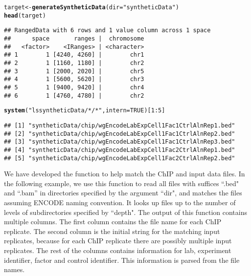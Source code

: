\documentclass[a4paper,10pt]{article}\usepackage[]{graphicx}\usepackage[]{color}
\makeatletter
\newcommand{\hlnum}[1]{\textcolor[rgb]{0.686,0.059,0.569}{#1}}%
\newcommand{\hlstr}[1]{\textcolor[rgb]{0.192,0.494,0.8}{#1}}%
\newcommand{\hlopt}[1]{\textcolor[rgb]{0,0,0}{#1}}%
\newcommand{\hlstd}[1]{\textcolor[rgb]{0.345,0.345,0.345}{#1}}%
\newcommand{\hlkwb}[1]{\textcolor[rgb]{0.69,0.353,0.396}{#1}}%
\newcommand{\hlkwc}[1]{\textcolor[rgb]{0.333,0.667,0.333}{#1}}%
\newcommand{\hlkwd}[1]{\textcolor[rgb]{0.737,0.353,0.396}{\textbf{#1}}}%
\newenvironment{kframe}{%
 \def\at@end@of@kframe{}%
 \ifinner\ifhmode%
  \def\at@end@of@kframe{\end{minipage}}%
  \begin{minipage}{\columnwidth}%
 \fi\fi%
 \def\FrameCommand##1{\hskip\@totalleftmargin \hskip-\fboxsep
 \colorbox{shadecolor}{##1}\hskip-\fboxsep
     \hskip-\linewidth \hskip-\@totalleftmargin \hskip\columnwidth}%
 \MakeFramed {\advance\hsize-\width
   \@totalleftmargin\z@ \linewidth\hsize
   \@setminipage}}%
 {\par\unskip\endMakeFramed%
 \at@end@of@kframe}
\newenvironment{knitrout}{}{} %
\makeatother
\begin{document}
\begin{knitrout}
\color{fgcolor}\begin{kframe}
\begin{alltt}
\hlstd{target} \hlkwb{<-} \hlkwd{generateSyntheticData}\hlstd{(}\hlkwc{dir} \hlstd{=} \hlstr{"syntheticData"}\hlstd{)}
\hlkwd{head}\hlstd{(target)}
\end{alltt}
\begin{verbatim}
## RangedData with 6 rows and 1 value column across 1 space
##      space       ranges |  chromosome
##   <factor>    <IRanges> | <character>
## 1        1 [4240, 4260] |        chr1
## 2        1 [1160, 1180] |        chr2
## 3        1 [2000, 2020] |        chr5
## 4        1 [5600, 5620] |        chr3
## 5        1 [9400, 9420] |        chr4
## 6        1 [4760, 4780] |        chr2
\end{verbatim}
\begin{alltt}
\hlkwd{system}\hlstd{(}\hlstr{"ls syntheticData/*/*"}\hlstd{,} \hlkwc{intern} \hlstd{=} \hlnum{TRUE}\hlstd{)[}\hlnum{1}\hlopt{:}\hlnum{5}\hlstd{]}
\end{alltt}
\begin{verbatim}
## [1] "syntheticData/chip/wgEncodeLabExpCell1Fac1CtrlAlnRep1.bed"
## [2] "syntheticData/chip/wgEncodeLabExpCell1Fac1CtrlAlnRep2.bed"
## [3] "syntheticData/chip/wgEncodeLabExpCell1Fac1CtrlAlnRep3.bed"
## [4] "syntheticData/chip/wgEncodeLabExpCell1Fac2CtrlAlnRep1.bed"
## [5] "syntheticData/chip/wgEncodeLabExpCell1Fac2CtrlAlnRep2.bed"
\end{verbatim}
\end{kframe}
\end{knitrout}

We have developed the  function to help match the ChIP and input data files. In the following example, we use this function to read all files with suffices ``.bed" and ``.bam'' in directories specified by the argument ``dir", and matches the files assuming ENCODE naming convention. It looks up files up to the number of levels of subdirectories specified by ``depth". The output of this function contains multiple columns. The first column contains the file name for each ChIP replicate. The second column is the initial string for the matching input replicates, because for each ChIP replicate there are possibly multiple input replicates. The rest of the columns contains information for lab, experiment identifier, factor and control identifier. This information is parsed from the file names.
\end{document}
